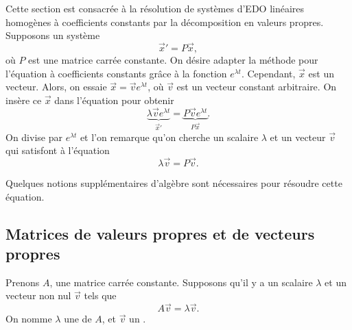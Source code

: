 Cette section est consacrée à la résolution de systèmes d'EDO linéaires homogènes à coefficients constants par la décomposition en valeurs propres. Supposons un système
\begin{equation*}
	{\vec{x}}' = P\vec{x} ,
\end{equation*}
où
$P$ est une matrice carrée constante. 
On désire adapter la méthode pour l'équation à coefficients constants grâce à la fonction $e^{\lambda t}$.
Cependant, $\vec{x}$ est un vecteur. Alors, on essaie $\vec{x} = \vec{v} e^{\lambda t}$, où
$\vec{v}$ est un vecteur constant arbitraire. On insère ce $\vec{x}$ dans l'équation pour obtenir
\begin{equation*}
	\underbrace{\lambda \vec{v} e^{\lambda t}}_{{\vec{x}}'} =
	\underbrace{P\vec{v} e^{\lambda t}}_{P\vec{x}} .
\end{equation*}
On divise par $e^{\lambda t}$ et l'on remarque qu'on cherche un scalaire $\lambda$
et un vecteur $\vec{v}$ qui satisfont à l'équation
\begin{equation*}
	\lambda \vec{v} = P\vec{v} .
\end{equation*}

Quelques notions supplémentaires d'algèbre sont nécessaires pour résoudre cette équation.

\subsection{Matrices de valeurs propres et de vecteurs propres}

Prenons $A$, une matrice carrée constante. Supposons qu'il y a un scalaire $\lambda$ et un vecteur non nul $\vec{v}$ tels que
\begin{equation*}
	A \vec{v} = \lambda \vec{v}.
\end{equation*}
On nomme $\lambda$ une \emph{} de $A$, et $\vec{v}$
un \emph{}.

